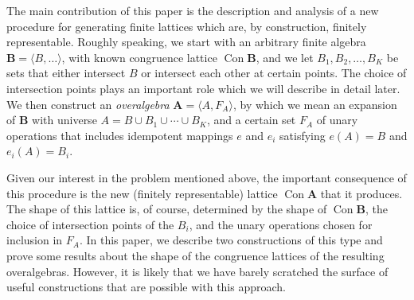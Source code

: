 \documentclass{au}
\numberwithin{equation}{section}
\theoremstyle{plain}
\theoremstyle{definition}
\newcommand{\defeq}{\ensuremath{=}}        %
\newcommand{\<}{\ensuremath{\langle}}
\renewcommand{\>}{\ensuremath{\rangle}}
\newcommand{\bA}{\ensuremath{\mathbf{A}}}
\newcommand{\bB}{\ensuremath{\mathbf{B}}}
\DeclareMathOperator{\Con}{Con}
\begin{document}
The main contribution of this paper is the description and analysis of a
new procedure for generating finite lattices which are, by
construction, finitely representable.
Roughly speaking, we start with an arbitrary finite algebra $\bB \defeq  \<B,
\dots\>$, with known congruence lattice $\Con\bB$, and we let $B_1, B_2, \dots,
B_K$ be sets that either intersect $B$ or intersect each other at certain points.
The choice of intersection points plays an important role which we will describe
in detail later.  We then construct an  {\it overalgebra} $\bA\defeq \<A,
F_A\>$, by which we mean an expansion of $\bB$ with universe $A = B \cup B_1
\cup \cdots \cup B_K$,  and a certain set $F_A$ of unary operations that
includes idempotent mappings $e$ and $e_i$ satisfying $e(A) = B$ and $e_i(A) =
B_i$.

Given our interest in the problem mentioned above, the important consequence of
this procedure is the new (finitely representable) lattice $\Con\bA$ that
it produces.  The shape of this lattice is, of course, determined by
the shape of $\Con\bB$, the choice of intersection points of the $B_i$, and the
unary operations chosen for inclusion in $F_A$.  In this paper, we
describe two constructions of this type and prove some results
about the shape of the congruence lattices of the resulting overalgebras.
However, it is likely that we have barely scratched the surface of useful
constructions that are possible with this approach.
\end{document}
